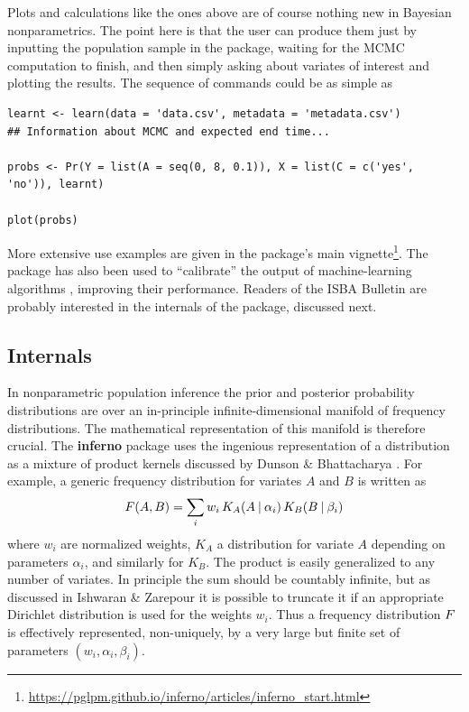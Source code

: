 Plots and calculations like the ones above are of course nothing new in Bayesian nonparametrics. The point here is that the user can produce them just by inputting the population sample in the package, waiting for the MCMC computation to finish, and then simply asking about variates of interest and plotting the results. The sequence of commands could be as simple as
\begin{verbatim}
learnt <- learn(data = 'data.csv', metadata = 'metadata.csv')
## Information about MCMC and expected end time...

probs <- Pr(Y = list(A = seq(0, 8, 0.1)), X = list(C = c('yes', 'no')), learnt)

plot(probs)
\end{verbatim}
More extensive use examples are given in the package's main vignette\footnote{\url{https://pglpm.github.io/inferno/articles/inferno_start.html}}. The package has also been used to ``calibrate'' the output of machine-learning algorithms \citep{dyrlandetal2022b}, improving their performance. Readers of the ISBA Bulletin are probably interested in the internals of the package, discussed next.


\subsection*{Internals}
\label{sec:representation}

In nonparametric population inference the prior and posterior probability distributions are over an in-principle infinite-dimensional manifold of frequency distributions. The mathematical representation of this manifold is therefore crucial. The \textbf{inferno} package uses the ingenious representation of a distribution as a mixture of product kernels discussed by Dunson \& Bhattacharya \citeyear{dunsonetal2011}. For example, a generic frequency distribution for variates $A$ and $B$ is written as
\begin{equation}
  \label{eq:mixture_kernel}
  \yF(A, B) = \sum_{i} w_{i}\, K_{A}(A \| \alpha_{i})\, K_{B}(B \| \beta_{i})
\end{equation}
where $w_{i}$ are normalized weights, $K_{A}$ a distribution for variate $A$ depending on parameters $\alpha_{i}$, and similarly for $K_{B}$. The product is easily generalized to any number of variates. In principle the sum should be countably infinite, but as discussed in Ishwaran \& Zarepour \citeyear{ishwaranetal2002c} it is possible to truncate it if an appropriate Dirichlet distribution is used for the weights $w_{i}$. Thus a frequency distribution $F$ is effectively represented, non-uniquely, by a very large but finite set of parameters $(w_{i}, \alpha_{i}, \beta_{i})$.

